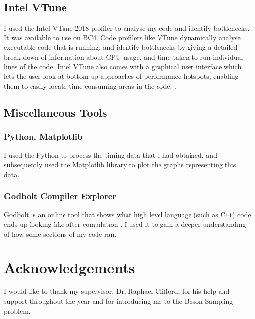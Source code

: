 \documentclass[ %
                    author={Manan Vaswani},
                supervisor={Dr. Raphael Clifford},
                    degree={MEng},
                     title={A multi-core CPU implementation \n of the classical Boson Sampling algorithm},
                  subtitle={},
                      type={},
                      year={2019} ]{dissertation}
\begin{document}
\section{Intel VTune}
I used the Intel VTune 2018 profiler to analyse my code and identify bottlenecks. It was available to use on BC4. Code profilers like VTune dynamically analyse executable code that is running, and identify bottlenecks by giving a detailed break down of information about CPU usage, and time taken to run individual lines of the code. Intel VTune also comes with a graphical user interface which lets the user look at bottom-up approaches of performance hotspots, enabling them to easily locate time-consuming areas in the code. \cite{vtune2018}.

\section{Miscellaneous Tools}
\subsection{Python, Matplotlib}
I used the Python to process the timing data that I had obtained, and subsequently used the Matplotlib library to plot the graphs representing this data.

\subsection{Godbolt Compiler Explorer}
Godbolt is an online tool that shows what high level language (such as C\texttt{++}) code ends up looking like after compilation \cite{god-bolt}. I used it to gain a deeper understanding of how some sections of my code ran.



\chapter*{Acknowledgements}

\noindent
I would like to thank my supervisor, Dr. Raphael Clifford, for his help and support throughout the year and for introducing me to the Boson Sampling problem.


%
\end{document}
